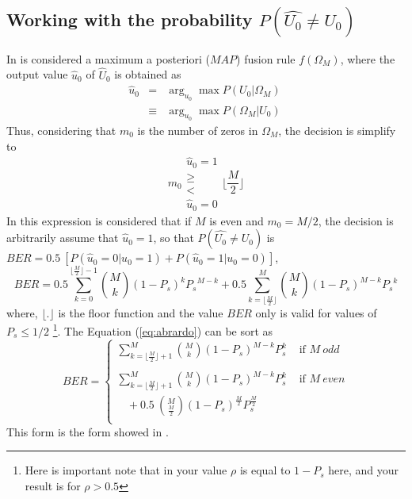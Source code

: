 \documentclass[a4paper,10pt]{article}
\begin{document}
\subsection{Working with the probability $P(\hat{U_0} \neq U_0)$}
In \cite{Abrardo2009,Ferrari2012} is considered a maximum a posteriori ($MAP$) 
fusion rule $f(\Omega_M)$, 
where the output value $\hat{u}_0$ of $\hat{U}_0$
is obtained as
\begin{equation}
\begin{matrix}
 \hat{u}_0 & =      & \arg_{u_0} \max P(U_0|\Omega_M)\\
 ~         & \equiv & \arg_{u_0} \max P(\Omega_M|U_0)\
\end{matrix}
\end{equation}
Thus, considering that $m_0$ is the number of zeros in $\Omega_M$, the decision is simplify to 
\begin{equation}
m_0
\begin{matrix}
\hat{u}_0=1 \\
\geq \\
< \\
\hat{u}_0=0
\end{matrix}
\lfloor \frac{M}{2}\rfloor
\end{equation}
In this expression is considered that if  $M$ is even and $m_0=M/2$, the decision 
is arbitrarily assume that $\hat{u}_0 = 1$,
so that  $P(\hat{U_0} \neq U_0)$ is $BER=0.5~[ P(\hat{u}_0=0|u_0=1)+P(\hat{u}_0=1|u_0=0) ]$,
\begin{equation} \label{eq:abrardo}
 BER= 0.5 \sum_{k=0}^{\lfloor \frac{M}{2} \rfloor -1}  \binom{M}{k} {(1-P_s)}^{k}   {P_s}^{M-k} 
    + 0.5 \sum_{k=\lfloor \frac{M}{2}     \rfloor}^{M} \binom{M}{k} {(1-P_s)}^{M-k} {P_s}^{k}   
\end{equation}
where, $\lfloor . \rfloor$ is the floor function and the value $BER$ only is valid for
values of $P_s \leq 1/2$ 
\footnote{Here is important note that in \cite{Abrardo2009,Ferrari2012} your value $\rho$
is equal to $1-P_s$ here, and your result is for $\rho > 0.5$}. The Equation 
(\ref{eq:abrardo}) can be sort as
\begin{equation}
BER= 
\begin{cases}
\sum \limits_{k=\lfloor \frac{M}{2} \rfloor +1}^{M} \binom{M}{k}  (1-P_s)^{M-k} P_s^k & \text{ if } M~odd \\ 
~ & ~ \\
\sum \limits_{k=\lfloor \frac{M}{2} \rfloor +1}^{M} \binom{M}{k}  (1-P_s)^{M-k} P_s^k & \text{ if } M~even \\
~~~~+0.5~\binom{M}{\frac{M}{2}}  (1-P_s)^{\frac{M}{2}} P_s^{\frac{M}{2}} & ~ \\
\end{cases}
\end{equation}
This form is the form showed in \cite{berbinaryceo}.
\end{document}
